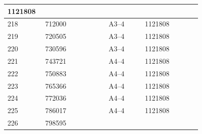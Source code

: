 \documentclass[UTF8,10pt,a4paper,fontset=fandol]{ctexart}
\newcommand{\fieldvalue}[1]{#1}
\begin{document}
\begin{center}
\begin{tabular}{|p{0.08\linewidth}|p{0.28\linewidth}|p{0.16\linewidth}|p{0.25\linewidth}|}
\fieldvalue{1121808} & \\ \hline
218 &
\fieldvalue{712000} &
\fieldvalue{A3--4} &
\fieldvalue{1121808} & \\ \hline
219 &
\fieldvalue{720505} &
\fieldvalue{A3--4} &
\fieldvalue{1121808} & \\ \hline
220 &
\fieldvalue{730596} &
\fieldvalue{A3--4} &
\fieldvalue{1121808} & \\ \hline
221 &
\fieldvalue{743721} &
\fieldvalue{A4--4} &
\fieldvalue{1121808} & \\ \hline
222 &
\fieldvalue{750883} &
\fieldvalue{A4--4} &
\fieldvalue{1121808} & \\ \hline
223 &
\fieldvalue{765366} &
\fieldvalue{A4--4} &
\fieldvalue{1121808} & \\ \hline
224 &
\fieldvalue{772036} &
\fieldvalue{A4--4} &
\fieldvalue{1121808} & \\ \hline
225 &
\fieldvalue{786017} &
\fieldvalue{A4--4} &
\fieldvalue{1121808} & \\ \hline
226 &
\fieldvalue{798595} &

\end{tabular}
\end{center}
\end{document}

